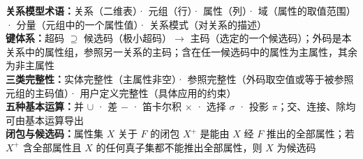 \documentclass[a4paper,11pt]{article}
\begin{document}

\begin{knowmap}
\textbf{关系模型术语：}关系（二维表）· 元组（行）· 属性（列）· 域（属性的取值范围）· 分量（元组中的一个属性值）· 关系模式（对关系的描述）\\[2pt]
\textbf{键体系：}超码 $\supseteq$ 候选码（极小超码）$\rightarrow$ 主码（选定的一个候选码）；外码是本关系中的属性组，参照另一关系的主码；含在任一候选码中的属性为主属性，其余为非主属性\\[2pt]
\textbf{三类完整性：}实体完整性（主属性非空）· 参照完整性（外码取空值或等于被参照元组的主码值）· 用户定义完整性（具体应用的约束）\\[2pt]
\textbf{五种基本运算：}并 $\cup$ · 差 $-$ · 笛卡尔积 $\times$ · 选择 $\sigma$ · 投影 $\pi$；交、连接、除均可由基本运算导出\\[2pt]
\textbf{闭包与候选码：}属性集 $X$ 关于 $F$ 的闭包 $X^{+}$ 是能由 $X$ 经 $F$ 推出的全部属性；若 $X^{+}$ 含全部属性且 $X$ 的任何真子集都不能推出全部属性，则 $X$ 为候选码
\end{knowmap}
\end{document}
